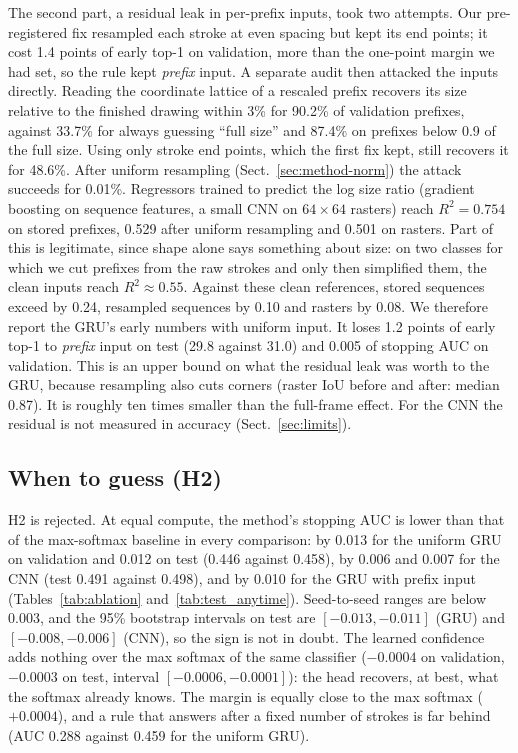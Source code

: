 The second part, a residual leak in per-prefix inputs, took two attempts. Our pre-registered fix
resampled each stroke at even spacing but kept its end points; it cost 1.4 points of early top-1
on validation, more than the one-point margin we had set, so the rule kept \emph{prefix} input.
A separate audit then attacked the inputs directly. Reading the coordinate lattice of a rescaled
prefix recovers its size relative to the finished drawing within 3\% for 90.2\% of validation
prefixes, against 33.7\% for always guessing ``full size'' and 87.4\% on prefixes below 0.9 of the
full size. Using only stroke end points, which the first fix kept, still recovers it for 48.6\%.
After uniform resampling (Sect.~\ref{sec:method-norm}) the attack succeeds for 0.01\%. Regressors
trained to predict the log size ratio (gradient boosting on sequence features, a small CNN on
$64\times64$ rasters) reach $R^2 = 0.754$ on stored prefixes, 0.529 after uniform resampling and
0.501 on rasters. Part of this is legitimate, since shape alone says something about size: on two
classes for which we cut prefixes from the raw strokes and only then simplified them, the clean
inputs reach $R^2 \approx 0.55$. Against these clean references, stored sequences exceed by 0.24,
resampled sequences by 0.10 and rasters by 0.08. We therefore
report the GRU's early numbers with uniform input. It loses 1.2 points of early top-1 to
\emph{prefix} input on test (29.8 against 31.0) and 0.005 of stopping AUC on validation. This is an
upper bound on what the residual leak was worth to the GRU, because resampling also cuts corners
(raster IoU before and after: median 0.87). It is roughly ten times smaller than the full-frame
effect. For the CNN the residual is not measured in accuracy (Sect.~\ref{sec:limits}).

\subsection{When to guess (H2)}
\label{sec:res-anytime}




H2 is rejected. At equal compute, the method's stopping AUC is lower than that of the max-softmax
baseline in every comparison: by 0.013 for the uniform GRU on validation and 0.012 on test
(0.446 against 0.458), by 0.006 and 0.007 for the CNN (test 0.491 against 0.498), and by 0.010 for
the GRU with prefix input (Tables~\ref{tab:ablation} and~\ref{tab:test_anytime}). Seed-to-seed
ranges are below 0.003, and the 95\% bootstrap intervals on test are $[-0.013, -0.011]$ (GRU) and
$[-0.008, -0.006]$ (CNN), so the sign is not in doubt. The learned confidence adds nothing over the
max softmax of the same classifier ($-0.0004$ on validation, $-0.0003$ on test, interval
$[-0.0006, -0.0001]$): the head
recovers, at best, what the softmax already knows. The margin is equally close to the max
softmax ($+0.0004$), and a rule that answers after a fixed number of strokes is far behind (AUC
0.288 against 0.459 for the uniform GRU).

